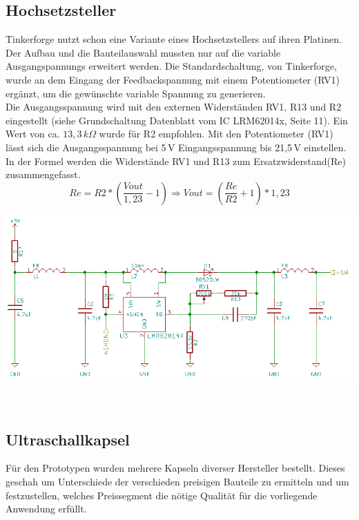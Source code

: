 \subsection{Hochsetzsteller}
Tinkerforge nutzt schon eine Variante eines Hochsetzstellers auf ihren Platinen. Der Aufbau und die Bauteilauswahl mussten nur auf die variable Ausgangspannungs erweitert werden. Die Standardschaltung, von Tinkerforge, wurde an dem Eingang der Feedbackspannung mit einem Potentiometer (RV1) ergänzt, um die gewünschte variable Spannung zu generieren.\\
Die Ausgangsspannung wird mit den externen Widerständen RV1, R13 und R2 eingestellt (siehe Grundschaltung Datenblatt vom IC LRM62014x, Seite 11). Ein Wert von ca. \(\displaystyle 13,3\,k\Omega \) wurde für R2 empfohlen. Mit den Potentiometer (RV1) lässt sich die Ausgangsspannung bei 5\,V Eingangsspannung bis 21,5\,V einstellen. In der Formel werden die Widerstände RV1 und R13 zum Ersatzwiderstand(Re) zusammengefasst.
\onehalfspacing \\
\[\displaystyle Re=R2*\left(\frac{Vout}{1,23}-1\right) \Rightarrow Vout=\left(\frac{Re}{R2}+1\right)*1,23\] 
\singlespacing
\begin{center}
\begin{minipage}{1\textwidth}
\includegraphics[width=1\textwidth%
]{Abbildungen/Pumpe.png}
\label{fig:Hochsetzsteller}
\end{minipage}\\
\end{center}

\subsection{Ultraschallkapsel}%
Für den Prototypen wurden mehrere Kapseln diverser Hersteller bestellt. Dieses geschah um Unterschiede der verschieden preisigen Bauteile zu ermitteln und um festzustellen, welches Preissegment die nötige Qualität für die vorliegende Anwendung erfüllt.



